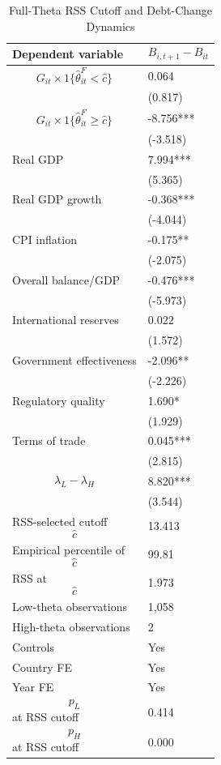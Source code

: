 \begin{table}[H]\centering
\begin{threeparttable}
\caption{Full-Theta RSS Cutoff and Debt-Change Dynamics}
\label{tab:deltaB_rss_cutoff_fulltheta}
\scriptsize
\begin{tabularx}{\textwidth}{lY}
\toprule
Dependent variable & $$B_{i,t+1}-B_{it}$$ \\
\midrule
$$G_{it}\times 1\{\widehat{\theta}^{F}_{it}<\widehat{c}\}$$ & 0.064 \\
 & (0.817) \\
$$G_{it}\times 1\{\widehat{\theta}^{F}_{it}\geq\widehat{c}\}$$ & -8.756*** \\
 & (-3.518) \\
Real GDP & 7.994*** \\
 & (5.365) \\
Real GDP growth & -0.368*** \\
 & (-4.044) \\
CPI inflation & -0.175** \\
 & (-2.075) \\
Overall balance/GDP & -0.476*** \\
 & (-5.973) \\
International reserves & 0.022 \\
 & (1.572) \\
Government effectiveness & -2.096** \\
 & (-2.226) \\
Regulatory quality & 1.690* \\
 & (1.929) \\
Terms of trade & 0.045*** \\
 & (2.815) \\
$$\lambda_L-\lambda_H$$ & 8.820*** \\
 & (3.544) \\
\midrule
RSS-selected cutoff $$\widehat{c}$$ & 13.413 \\
Empirical percentile of $$\widehat{c}$$ & 99.81 \\
RSS at $$\widehat{c}$$ & 1.973 \\
Low-theta observations & 1,058 \\
High-theta observations & 2 \\
Controls & Yes \\
Country FE & Yes \\
Year FE & Yes \\
$$p_L$$ at RSS cutoff & 0.414 \\
$$p_H$$ at RSS cutoff & 0.000 \\

\end{tabularx}
\end{threeparttable}
\end{table}
